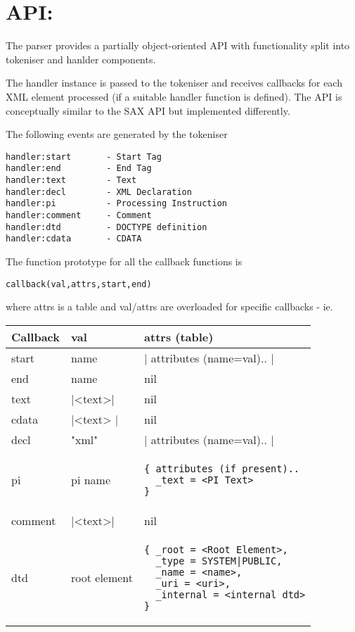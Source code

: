 \documentclass{ltxdoc}
\begin{document}
\section{API:}

The parser provides a partially object-oriented API with functionality
split into tokeniser and hanlder components.

The handler instance is passed to the tokeniser and receives callbacks
for each XML element processed (if a suitable handler function is
defined). The API is conceptually similar to the SAX API but implemented
differently.

The following events are generated by the tokeniser

\begin{verbatim}
handler:start       - Start Tag
handler:end         - End Tag
handler:text        - Text
handler:decl        - XML Declaration
handler:pi          - Processing Instruction
handler:comment     - Comment
handler:dtd         - DOCTYPE definition
handler:cdata       - CDATA 
\end{verbatim}
The function prototype for all the callback functions is

\begin{verbatim}
callback(val,attrs,start,end)
\end{verbatim}
where attrs is a table and val/attrs are overloaded for specific
callbacks - ie.

\begin{tabular}{llp{5cm}}
Callback   &  val        &    attrs (table)\\
\hline
start     &   name &   |{ attributes (name=val).. }|\\
end       &   name   &    nil\\
text      &   |<text>| &   nil\\
cdata     &   |<text> |  &   nil\\
decl      &   "xml"       &   |{ attributes (name=val).. }|\\
pi        &   pi name     &  \begin{verbatim}{ attributes (if present)..
  _text = <PI Text>
}\end{verbatim}\\
comment   &   |<text>|      &   nil\\     
dtd       &   root element  & \begin{verbatim}{ _root = <Root Element>,
  _type = SYSTEM|PUBLIC,
  _name = <name>,
  _uri = <uri>,
  _internal = <internal dtd>
}\end{verbatim}\\
\end{tabular}
\end{document}
